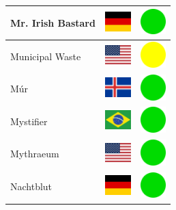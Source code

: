 \documentclass[12pt, a4paper, twoside]{report}
\begin{document}
\begin{center}
\begin{longtable}{|p{5cm}|p{2cm}|p{2cm}|}
Mr. Irish Bastard & \includegraphics[width=1cm]{4x3/de} & \includegraphics[width=1cm]{likes/y} \\ \hline
Municipal Waste & \includegraphics[width=1cm]{4x3/us} & \includegraphics[width=1cm]{likes/m} \\ \hline
Múr & \includegraphics[width=1cm]{4x3/is} & \includegraphics[width=1cm]{likes/y} \\ \hline
Mystifier & \includegraphics[width=1cm]{4x3/br} & \includegraphics[width=1cm]{likes/y} \\ \hline
Mythraeum & \includegraphics[width=1cm]{4x3/us} & \includegraphics[width=1cm]{likes/y} \\ \hline
Nachtblut & \includegraphics[width=1cm]{4x3/de} & \includegraphics[width=1cm]{likes/y} \\ \hline

\end{longtable}
\end{center}
\end{document}
